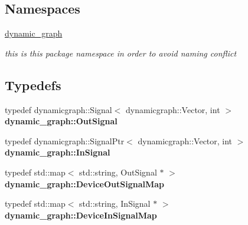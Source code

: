 \subsection*{Namespaces}
\begin{DoxyCompactItemize}
\item 
 \hyperlink{namespacedynamic__graph}{dynamic\+\_\+graph}
\begin{DoxyCompactList}\small\item\em this is this package namespace in order to avoid naming conflict \end{DoxyCompactList}\end{DoxyCompactItemize}
\subsection*{Typedefs}
\begin{DoxyCompactItemize}
\item 
typedef dynamicgraph\+::\+Signal$<$ dynamicgraph\+::\+Vector, int $>$ {\bfseries dynamic\+\_\+graph\+::\+Out\+Signal}\hypertarget{namespacedynamic__graph_a6c34573645d04590fd934e56f3d1b16b}{}\label{namespacedynamic__graph_a6c34573645d04590fd934e56f3d1b16b}

\item 
typedef dynamicgraph\+::\+Signal\+Ptr$<$ dynamicgraph\+::\+Vector, int $>$ {\bfseries dynamic\+\_\+graph\+::\+In\+Signal}\hypertarget{namespacedynamic__graph_a5a0e93b7f753ed4c9869e83a04c30d74}{}\label{namespacedynamic__graph_a5a0e93b7f753ed4c9869e83a04c30d74}

\item 
typedef std\+::map$<$ std\+::string, Out\+Signal $\ast$ $>$ {\bfseries dynamic\+\_\+graph\+::\+Device\+Out\+Signal\+Map}\hypertarget{namespacedynamic__graph_a4769898c82f6e8bef38422819cca0481}{}\label{namespacedynamic__graph_a4769898c82f6e8bef38422819cca0481}

\item 
typedef std\+::map$<$ std\+::string, In\+Signal $\ast$ $>$ {\bfseries dynamic\+\_\+graph\+::\+Device\+In\+Signal\+Map}\hypertarget{namespacedynamic__graph_a7deb814159c6992434f2660870726c73}{}\label{namespacedynamic__graph_a7deb814159c6992434f2660870726c73}

\end{DoxyCompactItemize}


